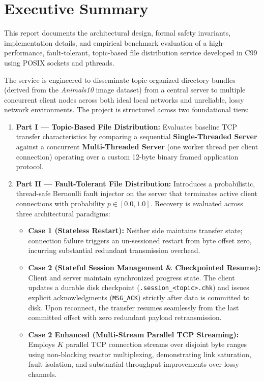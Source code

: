 \documentclass[11pt,a4paper]{article}
\begin{document}
\section{Executive Summary}

This report documents the architectural design, formal safety invariants, implementation details, and empirical benchmark evaluation of a high-performance, fault-tolerant, topic-based file distribution service developed in C99 using POSIX sockets and pthreads.

The service is engineered to disseminate topic-organized directory bundles (derived from the \textit{Animals10} image dataset) from a central server to multiple concurrent client nodes across both ideal local networks and unreliable, lossy network environments. The project is structured across two foundational tiers:
\begin{enumerate}
    \item \textbf{Part I --- Topic-Based File Distribution:} Evaluates baseline TCP transfer characteristics by comparing a sequential \textbf{Single-Threaded Server} against a concurrent \textbf{Multi-Threaded Server} (one worker thread per client connection) operating over a custom 12-byte binary framed application protocol.
    \item \textbf{Part II --- Fault-Tolerant File Distribution:} Introduces a probabilistic, thread-safe Bernoulli fault injector on the server that terminates active client connections with probability $p \in [0.0, 1.0]$. Recovery is evaluated across three architectural paradigms:
    \begin{itemize}
        \item \textbf{Case 1 (Stateless Restart):} Neither side maintains transfer state; connection failure triggers an un-sessioned restart from byte offset zero, incurring substantial redundant transmission overhead.
        \item \textbf{Case 2 (Stateful Session Management \& Checkpointed Resume):} Client and server maintain synchronized progress state. The client updates a durable disk checkpoint (\texttt{.session\_<topic>.chk}) and issues explicit acknowledgments (\texttt{MSG\_ACK}) strictly after data is committed to disk. Upon reconnect, the transfer resumes seamlessly from the last committed offset with zero redundant payload retransmission.
        \item \textbf{Case 2 Enhanced (Multi-Stream Parallel TCP Streaming):} Employs $K$ parallel TCP connection streams over disjoint byte ranges using non-blocking reactor multiplexing, demonstrating link saturation, fault isolation, and substantial throughput improvements over lossy channels.
    \end{itemize}
\end{enumerate}
\end{document}
